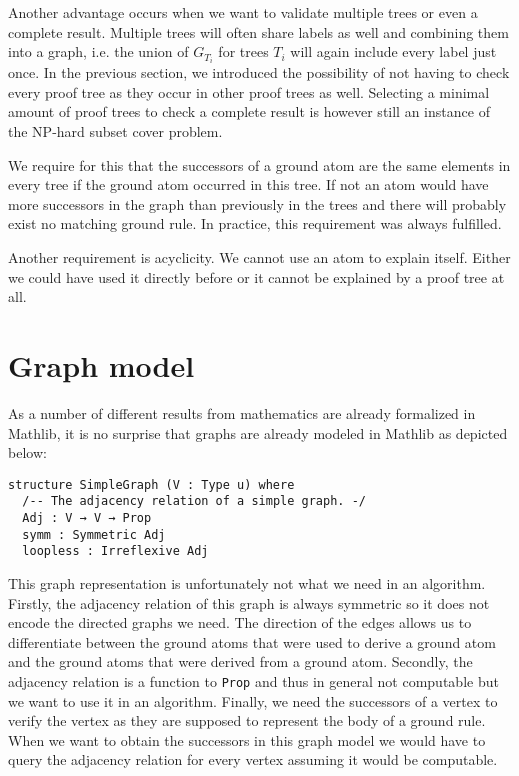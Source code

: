 Another advantage occurs when we want to validate multiple trees or even a complete result. Multiple trees will often share labels as well and combining them into a graph, i.e. the union of $G_{T_i}$ for trees $T_i$ will again include every label just once. In the previous section, we introduced the possibility of not having to check every proof tree as they occur in other proof trees as well. Selecting a minimal amount of proof trees to check a complete result is however still an instance of the NP-hard subset cover problem.

We require for this that the successors of a ground atom are the same elements in every tree if the ground atom occurred in this tree. If not an atom would have more successors in the graph than previously in the trees and there will probably exist no matching ground rule. In practice, this requirement was always fulfilled.

Another requirement is acyclicity. We cannot use an atom to explain itself. Either we could have used it directly before or it cannot be explained by a proof tree at all. 
\section{Graph model}

As a number of different results from mathematics are already formalized in Mathlib, it is no surprise that graphs are already modeled in Mathlib as depicted below:

\begin{lstlisting}
structure SimpleGraph (V : Type u) where
  /-- The adjacency relation of a simple graph. -/
  Adj : V → V → Prop
  symm : Symmetric Adj 
  loopless : Irreflexive Adj
\end{lstlisting}

This graph representation is unfortunately not what we need in an algorithm. Firstly, the adjacency relation of this graph is always symmetric so it does not encode the directed graphs we need. The direction of the edges allows us to differentiate between the ground atoms that were used to derive a ground atom and the ground atoms that were derived from a ground atom. Secondly, the adjacency relation is a function to \lstinline|Prop| and thus in general not computable but we want to use it in an algorithm. Finally, we need the successors of a vertex to verify the vertex as they are supposed to represent the body of a ground rule. When we want to obtain the successors in this graph model we would have to query the adjacency relation for every vertex assuming it would be computable.

